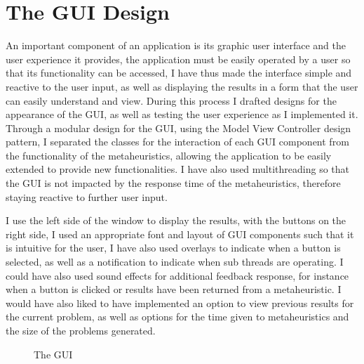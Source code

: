 \documentclass[]{final_report}
\begin{document}
\newpage
\section*{The GUI Design}

An important component of an application is its graphic user interface and the user experience it provides, the application must be easily operated by a user so that its functionality can be accessed, I have thus made the interface simple and reactive to the user input, as well as displaying the results in a form that the user can easily understand and view. During this process I drafted designs for the appearance of the GUI, as well as testing the user experience as I implemented it. Through a modular design for the GUI, using the Model View Controller design pattern, I separated the classes for the interaction of each GUI component from the functionality of the metaheuristics, allowing the application to be easily extended to provide new functionalities. I have also used multithreading so that the GUI is not impacted by the response time of the metaheuristics, therefore staying reactive to further user input.

I use the left side of the window to display the results, with the buttons on the right side, I used an appropriate font and layout of GUI components such that it is intuitive for the user, I have also used overlays to indicate when a button is selected, as well as a notification to indicate when sub threads are operating. I could have also used sound effects for additional feedback response, for instance when a button is clicked or results have been returned from a metaheuristic. I would have also liked to have implemented an option to view previous results for the current problem, as well as options for the time given to metaheuristics and the size of the problems generated.

\begin{figure}[h]
	\centering
	\fboxsep 2mm
	\caption{\label{fig:gui} The GUI}
\end{figure}
\end{document}
